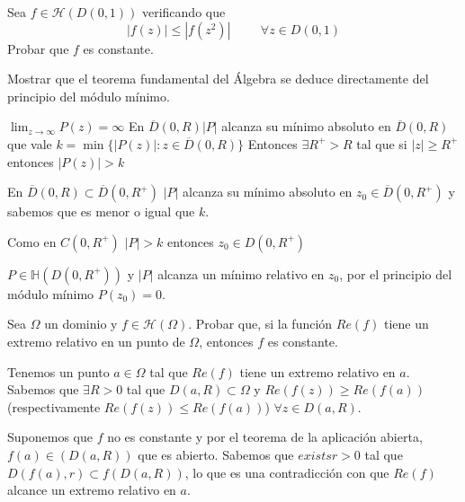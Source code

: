 


\begin{ejer}
	Sea $f\in\mathcal{H}(D(0,1))$ verificando que
	$$ |f(z)| \leq |f(z^2)| \hspace{1cm} \forall z\in D(0,1) $$
	Probar que $f$ es constante.
\end{ejer}



\begin{ejer}
	Mostrar que el teorema fundamental del Álgebra se deduce directamente del principio del módulo mínimo.
\end{ejer}
\begin{sol}
$\lim_{z\rightarrow\infty} P(z) = \infty$
En  $\overline{D}(0,R) |P|$ alcanza su mínimo absoluto en $\overline{D}(0,R)$ que vale $k=\min\{ |P(z)| : z\in\overline{D}(0,R) \}$ 
Entonces
$\exists R^+>R$ tal que si $|z|\geq R^+$ entonces $|P(z)| > k$

En $\overline{D}(0,R) \subset \overline{D}(0,R^+)$ $|P|$ alcanza su mínimo absoluto en $z_0\in\overline{D}(0,R^+)$ y sabemos que es menor o igual que $k$.

Como en $C(0,R^+)$ $|P|>k$ entonces $z_0\in D(0,R^+)$

$P\in\mathbb{H}(D(0,R^+))$ y $|P|$ alcanza un mínimo relativo en $z_0$, por el principio del módulo mínimo $P(z_0)=0$.
\end{sol}


\begin{ejer}
	Sea $\Omega$ un dominio y $f\in\mathcal{H}(\Omega)$.
	Probar que, si la función $Re(f)$ tiene un extremo relativo en un punto de $\Omega$, entonces $f$ es constante.
\end{ejer}
\begin{sol}
Tenemos un punto $a\in\Omega$ tal que $Re(f)$ tiene un extremo relativo en $a$.
Sabemos que $\exists R>0$ tal que $D(a,R)\subset\Omega$ y 
$Re(f(z)) \geq Re(f(a))$ (respectivamente $Re(f(z))\leq Re(f(a))$) $\forall z\in D(a,R)$.

Suponemos que $f$ no es constante y por el teorema de la aplicación abierta, $f(a)\in(D(a,R))$ que es abierto.
Sabemos que $exists r>0$ tal que $D(f(a),r) \subset f(D(a,R))$, lo que es una contradicción con que $Re(f)$ alcance un extremo relativo en $a$.
\end{sol}


